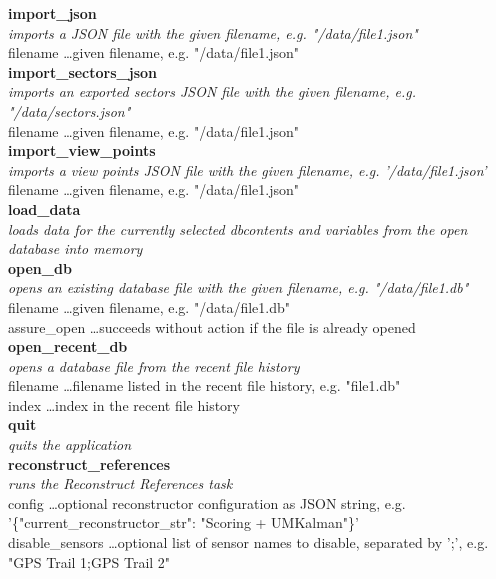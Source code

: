 \textbf{import\_json} \\
\textit{imports a JSON file with the given filename, e.g. "/data/file1.json"} \\
filename \dots given filename, e.g. "/data/file1.json" \\

\textbf{import\_sectors\_json} \\
\textit{imports an exported sectors JSON file with the given filename, e.g. "/data/sectors.json"} \\ 
filename \dots given filename, e.g. "/data/file1.json" \\

\textbf{import\_view\_points} \\
\textit{imports a view points JSON file with the given filename, e.g. '/data/file1.json'} \\
filename \dots given filename, e.g. "/data/file1.json" \\

\textbf{load\_data} \\
\textit{loads data for the currently selected dbcontents and variables from the open database into memory} \\

\textbf{open\_db} \\
\textit{opens an existing database file with the given filename, e.g. "/data/file1.db"} \\
filename \dots given filename, e.g. "/data/file1.db" \\
assure\_open \dots succeeds without action if the file is already opened \\

\textbf{open\_recent\_db} \\
\textit{opens a database file from the recent file history} \\
filename \dots filename listed in the recent file history, e.g. "file1.db" \\
index \dots index in the recent file history \\

\textbf{quit} \\
\textit{quits the application} \\

\textbf{reconstruct\_references} \\
\textit{runs the Reconstruct References task} \\
config \dots optional reconstructor configuration as JSON string, e.g. '\{"current\_reconstructor\_str": "Scoring + UMKalman"\}' \\
disable\_sensors \dots optional list of sensor names to disable, separated by ';', e.g. "GPS Trail 1;GPS Trail 2" \\


